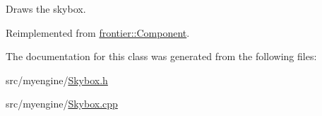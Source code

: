 Draws the skybox. 



Reimplemented from \hyperlink{classfrontier_1_1_component_ab920f9bc07ce051ebb5559c5a66508d1}{frontier\+::\+Component}.



The documentation for this class was generated from the following files\+:\begin{DoxyCompactItemize}
\item 
src/myengine/\hyperlink{_skybox_8h}{Skybox.\+h}\item 
src/myengine/\hyperlink{_skybox_8cpp}{Skybox.\+cpp}\end{DoxyCompactItemize}
